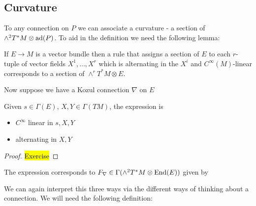 \documentclass{article}
\begin{document}
\subsection{Curvature}

To any connection on $P$ we can associate a curvature - a section of $\wedge^2 T^\ast M \otimes \operatorname{ad}(P)$. To aid in the definition we need the following lemma:

\begin{lemma}
	If $E\to M$ is a vector bundle then a rule that assigns a section of $E$ to each $r$-tuple of vector fields $X^1, \dots, X^r$ which is alternating in the $X^i$ and $C^\infty(M)$-linear corresponds to a section of $\wedge^r T^\ast M \otimes E$. 
\end{lemma}

Now suppose we have a Kozul connection $\nabla$ on $E$

\begin{lemma}
	Given $s \in \Gamma(E), \, X,Y \in \Gamma(TM)$, the expression 
is 
\begin{itemize}
	\item $C^\infty$ linear in $s,X,Y$ 
	\item alternating in $X,Y$
\end{itemize}
\end{lemma}
\begin{proof}
	\hl{Exercise}
\end{proof}

\begin{corollary}
	The expression corresponds to $F_\nabla \in \Gamma(\wedge^2 T^\ast M \otimes \operatorname{End}(E))$ given by 
\end{corollary}

We can again interpret this three ways via the different ways of thinking about a connection. We will need the following definition:
\end{document}
